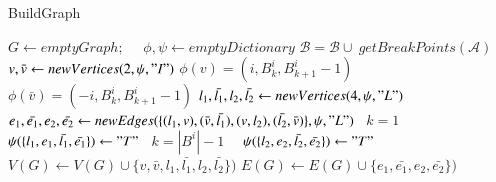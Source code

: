 \documentclass[phd,tocprelim]{cornell}
\renewcommand{\caption}[1]{\singlespacing\hangcaption{#1}\normalspacing}
\begin{document}
\begin{algorithm}[h!] 
    \caption{BuildGraph} 
    \label{algo:buildgraph}  
    \begin{algorithmic}[1]
         
        \State $G \gets emptyGraph;\quad$ $\phi, \psi \gets emptyDictionary$
        \State $\mathcal{B} = \mathcal{B} \cup \ getBreakPoints(\mathcal{A})$ 
        \State $v, \bar{v} \gets newVertices(2, \psi, "I")$ 
        \State $\phi(v) = (i, B^i_k, B^i_{k+1}-1)$
        \State $\phi(\bar{v}) = (-i, B^i_k, B^i_{k+1}-1)$
        \State $l_1, \bar{l_1}, l_2, \bar{l_2} \gets newVertices(4, \psi, "L")$
        \State $e_1, \bar{e_1}, e_2, \bar{e_2} \gets newEdges(\{ (l_1, v), (\bar{v},\bar{l_1}), (v, l_2), (\bar{l_2},\bar{v}) \}, \psi, "L")$
        \State \algorithmicif\ $k = 1$ \ \algorithmicthen\ \ $\psi(\{l_1, e_1, \bar{l_1}, \bar{e_1} \}) \gets "T"$  
        \State \algorithmicif\ $k = |B^i|-1$ \ \algorithmicthen\ $\psi(\{l_2, e_2, \bar{l_2}, \bar{e_2} \}) \gets "T"$
        \State $V(G) \gets V(G) \cup  \{ v, \bar{v}, l_1, \bar{l_1}, l_2, \bar{l_2} \})$
        \State $E(G) \gets E(G) \cup  \{ e_1, \bar{e_1}, e_2, \bar{e_2} \})$
        \EndFor        
    \end{algorithmic}
\end{algorithm}

\newpage
\end{document}

